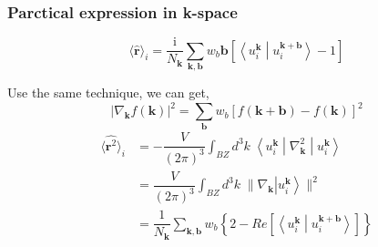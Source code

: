 \documentclass{beamer}
\begin{document}
  \begin{frame}
    \frametitle{Parctical expression in k-space}

    \begin{equation*}
        \langle\widehat{\mathbf{r}}\rangle_i = \dfrac{\mathrm{i}}{N_\mathbf{k}}\sum_{\mathbf{k},\mathbf{b}}w_b\mathbf{b}\left[\left\langle{}u_i^{\mathbf{k}}\middle|u_i^{\mathbf{k}+\mathbf{b}}\right\rangle-1\right]
    \end{equation*}

    Use the same technique, we can get, 
    \begin{equation}
      |\nabla_{\mathbf{k}}f(\mathbf{k})|^2 = \sum_{\mathbf{b}}w_b\left[f(\mathbf{k}+\mathbf{b})-f(\mathbf{k})\right]^2
    \end{equation}
    \begin{equation}
      \begin{aligned}
        \langle\widehat{\mathbf{r}^2}\rangle_i &= -\dfrac{V}{(2\pi)^3}\int_{BZ}d^3k\;\left\langle{}u_i^{\mathbf{k}}\middle|\nabla^2_{\mathbf{k}}\middle|u_i^{\mathbf{k}}\right\rangle\\
        &= \dfrac{V}{(2\pi)^3}\int_{BZ}d^3k\;\Big\lVert\nabla_{\mathbf{k}}\left|u_i^{\mathbf{k}}\right\rangle\Big\rVert^2\\
        &= \dfrac{1}{N_\mathbf{k}}\sum_{\mathbf{k},\mathbf{b}}w_b\left\{2-Re\left[\left\langle{}u_i^{\mathbf{k}}\middle|u_i^{\mathbf{k}+\mathbf{b}}\right\rangle\right]\right\}
      \end{aligned}
    \end{equation}
  \end{frame}
\end{document}
